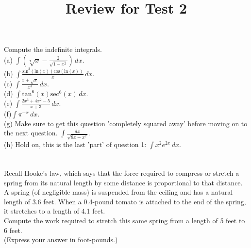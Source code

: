 \documentclass[11pt]{article}
\begin{document}
\title{Review for Test 2}

\maketitle

\section{}

Compute the indefinite integrals.\\

(a) $\int \left(\sqrt[7]{x} - \frac{2}{\sqrt{1-x^2}}\right) \, dx$.\\

(b) $\int \frac{\text{sin}^2(\text{ln}(x))\text{cos}(\text{ln}(x))}{x} \, dx$.\\

(c) $\int \frac{x + \sqrt{x}}{x^3} \, dx$. \\

(d) $\int \text{tan}^6(x)\text{sec}^6(x) \, dx$.\\

(e) $\int \frac{2x^3 + 4x^2 - 5}{x+3} \, dx$.\\

(f)$\int \pi^{-x} \, dx $.\\

(g) Make sure to get this question 'completely squared away' before moving on to the next question. $\int \frac{dx}{\sqrt{8x - x^2}}$.\\

(h) Hold on, this is the last 'part' of question 1: $\int x^2e^{2x} \, dx$.

\section{}

Recall Hooke’s law, which says that the force required to compress or stretch a
spring from its natural length by some distance is proportional to that distance.\\

A spring (of negligible mass) is suspended from the ceiling and has a natural length of
3.6 feet. When a 0.4-pound tomato is attached to the end of the spring, it stretches to a
length of 4.1 feet.\\

Compute the work required to stretch this same spring from a length of 5 feet to 6 feet.\\
(Express your answer in foot-pounds.)\\
\end{document}
